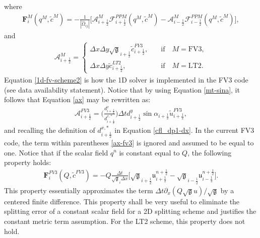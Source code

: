 \documentclass[preprint,12pt]{elsarticle}
\begin{document}
\begin{linenumbers}
\begin{equation}
\end{equation}
where
\begin{align}
	\label{F-operator}
	\mathbf{F}_{i}^M(q^M,\tilde{c}^{M}) =
	- \frac{1}{|\hat{\Omega}_{ij}|}
	\bigg[\mathcal{A}_{i+\frac{1}{2}}^M
	\mathcal{F}_{i+\frac{1}{2}}^{PPM}
	({{q}^M, \tilde{c}^{M}})-
	\mathcal{A}_{i-\frac{1}{2}}^M
	\mathcal{F}_{i-\frac{1}{2}}^{PPM}
	({{q}^M, \tilde{c}^{M}})\bigg],
\end{align}
and
\begin{align}
	\label{ax}
	\mathcal{A}_{i+\frac{1}{2}}^M = 
	\begin{cases}
		{\Delta x}{\Delta y}\sqrt{\mathfrak{g}}_{i+\frac{1}{2}} {\tilde{c}}_{i+\frac{1}{2}}^{FV3},
		\quad &\text{if} \quad M=\text{FV3},\\
		{\Delta x}{\Delta y}{\tilde{c}}_{i+\frac{1}{2}}^{LT2},
		\quad &\text{if} \quad M=\text{LT2}.
	\end{cases}
\end{align}
Equation \eqref{1d-fv-scheme2} is how the 1D solver is implemented in the FV3 code (see data availability statement). 
Notice that by using Equation \eqref{mt-sina}, it follows that Equation \eqref{ax} may be rewritten as:
\begin{align}
	\label{ax-fv3}
	\mathcal{A}_{i+\frac{1}{2}}^{FV3} = 
\bigg( \frac{{d}^x_{i+\frac{1}{2}}}{{d}^{x,*}_{i+\frac{1}{2}}}\bigg)
  		\Delta t
		d^y_{i+\frac{1}{2}} 
		\sin{\alpha_{i+\frac{1}{2}}}
        {\tilde{u}}_{i+\frac{1}{2}}^{FV3},
\end{align}
and recalling the definition of ${{d}^{x,*}_{i+\frac{1}{2}}}$ in Equation \eqref{cfl_dp1-dx}.
In the current FV3 code, the term within parentheses \eqref{ax-fv3} is ignored and assumed to be equal to one.
Notice that if the scalar field $q^n$ is constant equal to $Q$, the following property holds:
\begin{align}
	\label{F-operator-prop}
	\mathbf{F}_{i}^{FV3}(Q,\tilde{c}^{FV3}) =
	- Q\frac{\Delta t}{	\sqrt{\mathfrak{g}}_{i}\Delta x}
	\bigg[
	\sqrt{\mathfrak{g}}_{i+\frac{1}{2}}
	\mathfrak{u}_{i+\frac{1}{2}}^{n+\frac{1}{2}}-
	\sqrt{\mathfrak{g}}_{i-\frac{1}{2}}
	\mathfrak{u}_{i-\frac{1}{2}}^{n+\frac{1}{2}}\bigg].
\end{align}
This property essentially approximates the term $\Delta t\partial_x(Q{\sqrt{\mathfrak{g}}u})/\sqrt{\mathfrak{g}}$ by a centered finite difference. 
This property shall be very useful to eliminate the splitting error of a constant scalar field for a 2D splitting scheme and justifies the constant metric term assumption. 
For the LT2 scheme, this property does not hold.


\end{linenumbers}
\end{document}
